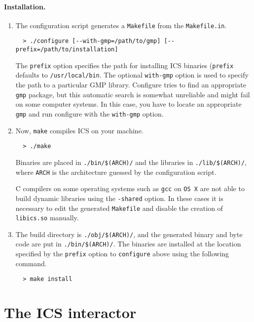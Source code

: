 \documentclass[12pt]{article}
\begin{document}
\paragraph{Installation.}
\begin{enumerate}
\item
The configuration script generates a \texttt{Makefile} from the
\texttt{Makefile.in}. 
  \begin{verbatim}
  > ./configure [--with-gmp=/path/to/gmp] [--prefix=/path/to/installation]
  \end{verbatim} 
The \texttt{prefix} option specifies the path for installing ICS binaries 
(\texttt{prefix} defaults to \texttt{/usr/local/bin}\@. 
The optional \texttt{with-gmp} option is used to specify the path to a 
particular GMP library.  Configure tries to find an appropriate \texttt{gmp}
package, but this automatic search is somewhat unreliable and might fail on 
some computer systems.  In this case, you have to locate an 
appropriate \texttt{gmp} and run configure with the \texttt{with-gmp} option.

\item
Now, {\tt make} compiles ICS on your machine.
  \begin{verbatim}
  > ./make
  \end{verbatim}
Binaries are placed in \texttt{./bin/\$(ARCH)/} and
the libraries in {\tt ./lib/\$(ARCH)/}, where \texttt{ARCH}
is the architecture guessed by the configuration script.

C compilers on some operating systems such as \texttt{gcc} on \texttt{OS X} 
are not able to build dynamic libraries using the \texttt{-shared} option.  
In these cases it is necessary to edit the generated \texttt{Makefile} and disable 
the creation of \texttt{libics.so} manually.

\item
The build directory is {\tt ./obj/\$(ARCH)/}, and the generated
binary and byte code are put in \texttt{./bin/\$(ARCH)/}\@.
The binaries are installed at the location specified by the \texttt{prefix}
option to \texttt{configure} above using the following command.
  \begin{verbatim}
  > make install
  \end{verbatim}
\end{enumerate}


\section{The ICS interactor}\label{sec:interactor}
\end{document}

